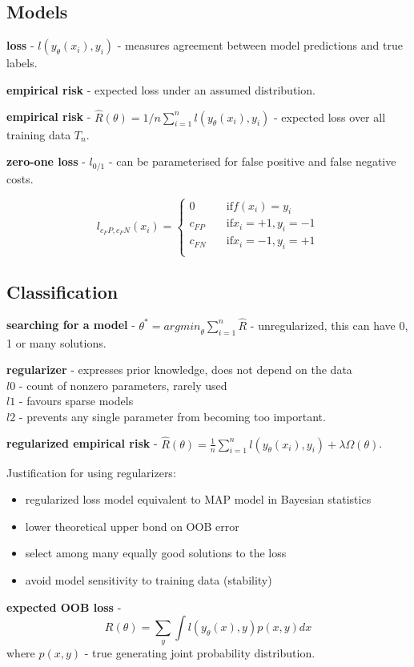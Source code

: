 \documentclass{article}
\newcommand{\para}[0]{\par\vspace{0.2cm}\noindent}
\newcommand{\define}[2]{\textbf{#1} - {#2}.  \para}
\begin{document}
\subsection{Models}
\define{loss}
           {$l(y_\theta(x_i), y_i)$ - measures agreement between model predictions and true labels}
\define{empirical risk}
           {expected loss under an assumed distribution}
\define{empirical risk}
           {$\hat R(\theta) = 1/n \sum_{i=1}^n l(y_\theta(x_i), y_i)$ - expected loss over all training data $T_n$}
\define{zero-one loss}
           {$l_{0/1}$ - can be parameterised for false positive and false negative costs}
$$l_{c_FP, c_FN}(x_i) =
  \begin{cases}
    0         & \quad \mathrm{if } f(x_i) = y_i  \\
    c_{FP}    & \quad \mathrm{if } x_i = +1, y_i = -1  \\
    c_{FN}    & \quad \mathrm{if } x_i = -1, y_i = +1  \\
  \end{cases}$$


\subsection{Classification}
\define{searching for a model}
           {$\theta^* = {argmin}_\theta \sum_{i=1}^n \hat R$ - unregularized, this can have 0, 1 or many solutions}

\define{regularizer}
           {expresses prior knowledge, does not depend on the data  \\
            $l0$ - count of nonzero parameters, rarely used  \\
            $l1$ - favours sparse models  \\
            $l2$ - prevents any single parameter from becoming too important}
\para
\define{regularized empirical risk}
           {$\hat R(\theta) = \frac{1}{n} \sum_{i=1}^n l(y_\theta(x_i), y_i) + \lambda \Omega (\theta)$}

Justification for using regularizers:
\begin{itemize}
    \item{regularized loss model equivalent to MAP model in Bayesian statistics}
    \item{lower theoretical upper bond on OOB error}
    \item{select among many equally good solutions to the loss}
    \item{avoid model sensitivity to training data (stability)}
\end{itemize}
\para
\define{expected OOB loss}{
    $$R(\theta) = \sum_y \int l(y_\theta(x), y) p(x, y) dx$$
    where $p(x, y)$ - true generating joint probability distribution}
\end{document}
